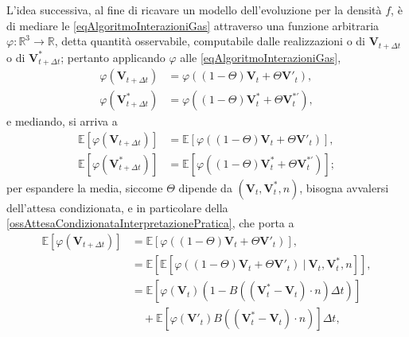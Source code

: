        L'idea successiva, al fine di ricavare un modello dell'evoluzione per la densità \(f\), è di mediare le \ref{eqAlgoritmoInterazioniGas} attraverso una funzione arbitraria \(\varphi\colon\mathbb R^3\to\mathbb R\), detta quantità osservabile, computabile dalle realizzazioni o di \(\mathbf V_{t+\Delta t}\) o di \(\mathbf V^*_{t+\Delta t}\); pertanto applicando \(\varphi\) alle \ref{eqAlgoritmoInterazioniGas},
        \begin{equation*}
          \begin{aligned}
            \varphi(\mathbf V_{t+\Delta t})&=\varphi((1-\Theta)\mathbf V_t+\Theta\mathbf V'_t),\\
            \varphi(\mathbf V^*_{t+\Delta t})&=\varphi((1-\Theta)\mathbf V^*_t+\Theta\mathbf V^{*\prime}_t),
          \end{aligned}
        \end{equation*}
        e mediando, si arriva a
        \begin{equation*}
          \begin{aligned}
            \mathbb E[\varphi(\mathbf V_{t+\Delta t})]&=\mathbb E[\varphi((1-\Theta)\mathbf V_t+\Theta\mathbf V'_t)],\\
            \mathbb E[\varphi(\mathbf V^*_{t+\Delta t})]&=\mathbb E[\varphi((1-\Theta)\mathbf V^*_t+\Theta\mathbf V^{*\prime}_t)];
          \end{aligned}
        \end{equation*}
        per espandere la media, siccome \(\Theta\) dipende da \((\mathbf V_t,\mathbf V^*_t,n)\), bisogna avvalersi dell'attesa condizionata, e in particolare della \cref{ossAttesaCondizionataInterpretazionePratica}, che porta a
        \begin{equation}
          \label{eqMediaCondizionataGas}
          \begin{aligned}
            \mathbb E[\varphi(\mathbf V_{t+\Delta t})]
            &=\mathbb E[\varphi((1-\Theta)\mathbf V_t+\Theta\mathbf V'_t)],
            \\&=\mathbb E[\mathbb E[\varphi((1-\Theta)\mathbf V_t+\Theta\mathbf V'_t)\ |\ \mathbf V_t,\mathbf V_t^*,n]],
            \\&=\mathbb E[\varphi(\mathbf V_t)(1-B((\mathbf V^*_t-\mathbf V_t)\cdot n)\Delta t)]
            \\&\quad+\mathbb E[\varphi(\mathbf V'_t)B((\mathbf V^*_t-\mathbf V_t)\cdot n)]\Delta t,
          \end{aligned}
        \end{equation}

